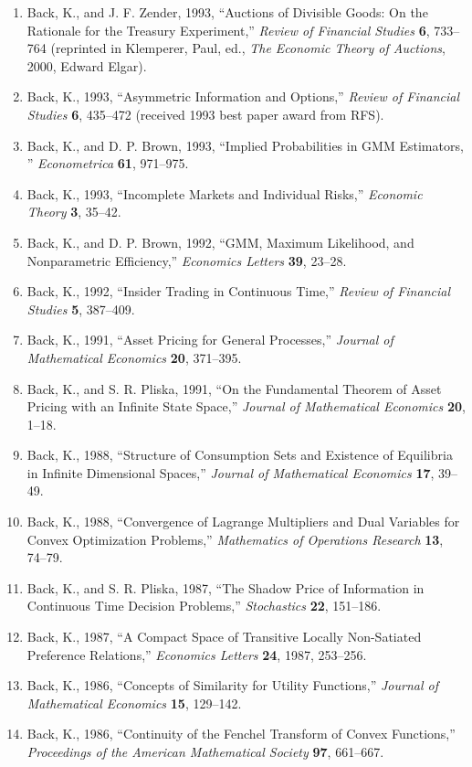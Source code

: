 \documentclass[margin, 11pt]{res}
\begin{document}
\begin{resume}
\begin{enumerate}
{\bf 1}, 385--402.
\item Back, K., and J. F. Zender, 1993, ``Auctions of Divisible Goods: On the Rationale for the Treasury
Experiment,'' {\em Review of Financial Studies\/}
{\bf 6}, 733--764 (reprinted in Klemperer, Paul, ed., {\em The Economic Theory of Auctions}, 2000, Edward Elgar).
\item Back, K., 1993, ``Asymmetric Information and Options,'' {\em Review of Financial
Studies} {\bf 6}, 435--472 (received 1993 best paper award from RFS).
\item  Back, K., and D. P. Brown, 1993, ``Implied Probabilities in GMM Estimators, ''
{\em Econometrica\/} {\bf 61}, 971--975.
\item Back, K., 1993, ``Incomplete Markets and Individual Risks,''
{\em Economic Theory\/} {\bf 3}, 35--42.
\item  Back, K., and D. P. Brown, 1992, ``GMM, Maximum Likelihood, and Nonparametric
Efficiency,'' {\em Economics Letters\/}
{\bf 39}, 23--28.
\item  Back, K., 1992, ``Insider Trading in Continuous Time,'' {\em Review of Financial
Studies\/} {\bf 5}, 387--409.
\item  Back, K., 1991, ``Asset Pricing for General Processes,'' {\em Journal of
Mathematical Economics\/} {\bf 20}, 371--395.
\item  Back, K., and S. R. Pliska, 1991, ``On the Fundamental Theorem of Asset Pricing with an
Infinite
State Space,''
{\em Journal of Mathematical Economics\/} {\bf 20}, 1--18.
\item  Back, K., 1988, ``Structure of Consumption Sets and Existence of Equilibria
in Infinite Dimensional Spaces,'' {\em Journal of Mathematical
Economics\/} {\bf 17}, 39--49.
\item  Back, K., 1988, ``Convergence of Lagrange Multipliers and Dual Variables for
Convex Optimization Problems,'' {\em Mathematics of Operations
Research\/} {\bf 13}, 74--79.
\item  Back, K., and S. R. Pliska, 1987, ``The Shadow Price of Information in Continuous Time
Decision
Problems,'' {\em Stochastics\/} {\bf 22}, 151--186.
\item  Back, K., 1987, ``A Compact Space of Transitive Locally Non-Satiated
Preference Relations,'' {\em Economics Letters\/} {\bf 24}, 1987,
253--256.
\item  Back, K., 1986,
``Concepts of Similarity for Utility Functions,'' {\em
Journal of Mathematical Economics\/} {\bf 15}, 129--142.
\item  Back, K., 1986, ``Continuity of the Fenchel Transform of Convex Functions,''
{\em Proceedings of the American Mathematical Society\/} {\bf 97},
661--667.
\end{enumerate}


\end{resume}
\end{document}
